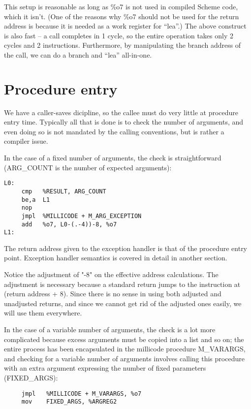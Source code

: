 This setup is reasonable as long as \%o7 is not used in compiled Scheme
code, which it isn't. (One of the reasons why \%o7 should not be used
for the return address is because it is needed as a work register for
``lea''.)  The above construct is also fast -- a call completes in 1
cycle, so the entire operation takes only 2 cycles and 2 instructions.
Furthermore, by manipulating the branch address of the call, we can do
a branch and ``lea'' all-in-one.

\section{Procedure entry}

We have a caller-saves dicipline, so the callee must do very little at
procedure entry time. Typically all that is done is to check the number
of arguments, and even doing so is not mandated by the calling conventions,
but is rather a compiler issue.

In the case of a fixed number of arguments, the check is straightforward
(ARG\_COUNT is the number of expected arguments):

\begin{verbatim}
L0:
     cmp   %RESULT, ARG_COUNT
     be,a  L1
     nop
     jmpl  %MILLICODE + M_ARG_EXCEPTION
     add   %o7, L0-(.-4))-8, %o7
L1:
\end{verbatim}

The return address given to the exception handler is that of the procedure
entry point. Exception handler semantics is covered in detail in another
section.

Notice the adjustment of "-8" on the effective address calculations.
The adjustment is necessary because a standard return jumps to the
instruction at (return address + 8).  Since there is no sense in using
both adjusted and unadjusted returns, and since we cannot get rid of
the adjusted ones easily, we will use them everywhere.

In the case of a variable number of arguments, the check is a lot more 
complicated because excess arguments must be copied into a list and so
on; the entire process has been encapsulated in the millicode procedure
M\_VARARGS, and checking for a variable number of arguments involves
calling this procedure with an extra argument expressing the number of
fixed parameters (FIXED\_ARGS):

\begin{verbatim}
     jmpl   %MILLICODE + M_VARARGS, %o7
     mov    FIXED_ARGS, %ARGREG2
\end{verbatim}

